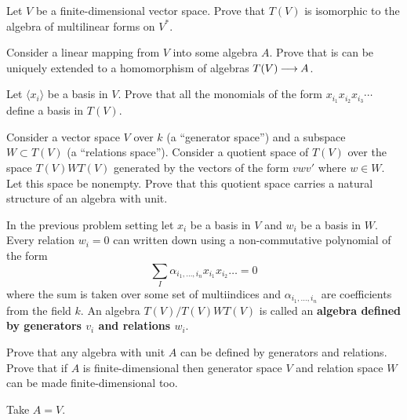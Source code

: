 \documentclass[12pt]{article}
\begin{document}
\begin{zadacha}[!]
  Let $V$ be a finite-dimensional vector space. Prove that $T(V)$ is
  isomorphic to the algebra of multilinear forms on $V^*$.
\end{zadacha}

\begin{zadacha}[*]
  Consider a linear mapping from $V$ into some algebra $A$. Prove that
  is can be uniquely extended to a homomorphism of algebras
  $T(V){\:\longrightarrow\:} A$.
\end{zadacha}

\begin{zadacha}[!]\label{_tensor_monomials_Zadacha_}
  Let $\langle x_i\rangle $ be a basis in $V$. Prove that all the
  monomials of the form $x_{i_1} x_{i_2} x_{i_3}\cdots$ define a basis
  in $T(V)$.
\end{zadacha}

\begin{zadacha}[!]
  Consider a vector space $V$ over $k$ (a ``generator space'') and a
  subspace $W\subset T(V)$ (a ``relations space''). Consider a
  quotient space of $T(V)$ over the space $T(V) W T(V)$ generated by the
  vectors of the form $v w v'$ where $w\in W$. Let this space be
  nonempty. Prove that this quotient space carries a natural structure
  of an algebra with unit.
\end{zadacha}

\begin{opredelenie}
In the previous problem setting let $x_i$ be a basis in $V$ and $w_i$
be a basis in $W$. Every relation $w_i=0$ can written down using a
non-commutative polynomial of the form
\[ 
\sum_I \alpha_{i_1, \dots, i_n} x_{i_1}x_{i_2}\dots =0
\]
where the sum is taken over some set of multiindices and $\alpha_{i_1,
  \dots, i_n}$ are coefficients from the field $k$.  An algebra
$T(V)/T(V) W T(V)$ is called an {\bf algebra defined by generators
  $v_i$ and relations $w_i$}.
\end{opredelenie}

\begin{zadacha}
  Prove that any algebra with unit $A$ can be defined by generators
  and relations. Prove that if $A$ is finite-dimensional then
  generator space $V$ and relation space $W$ can be made
  finite-dimensional too.
\end{zadacha}

\begin{ukazanie}
Take $A=V$.
\end{ukazanie}
\end{document}

